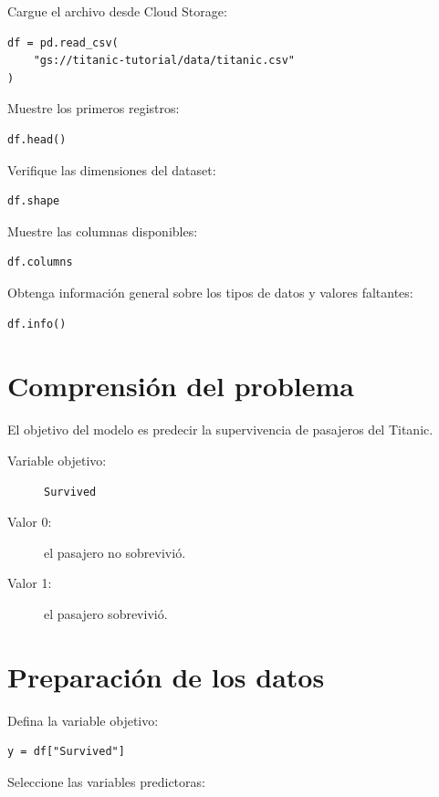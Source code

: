\documentclass[
  coursetitle={Cómputo Nube y Tecnologías Emergentes},
  coursehours={96},
  coursedate={Verano 2026},
  doctype={Tutorial},
  otherlangs={english,french},
  authorname={Lázaro},
  authorsurname={Bustio-Martínez},
  authortitle={PhD},
  role={Profesor Investigador},
  email={lbustio@inaoe.mx},
  phone={5559504000},
  ext={7459},
  institution={Instituto Nacional de Astrofísica, Óptica y Electrónica (INAOE)},
  department={Maestría en Ciencias en Tecnologías de Seguridad},
  address={Luis Enrique Erro 1, Sta. Ma. Tonantzintla, San Andrés Cholula, CP 72840, Puebla, México},
  margin={0.5in}
]{../../lbustio_lecture_notes}
\begin{document}
Cargue el archivo desde Cloud Storage:

\begin{lstlisting}
df = pd.read_csv(
    "gs://titanic-tutorial/data/titanic.csv"
)
\end{lstlisting}

Muestre los primeros registros:

\begin{lstlisting}
df.head()
\end{lstlisting}

Verifique las dimensiones del dataset:

\begin{lstlisting}
df.shape
\end{lstlisting}

Muestre las columnas disponibles:

\begin{lstlisting}
df.columns
\end{lstlisting}

Obtenga información general sobre los tipos de datos y valores faltantes:

\begin{lstlisting}
df.info()
\end{lstlisting}

\section{Comprensión del problema}

El objetivo del modelo es predecir la supervivencia de pasajeros del Titanic.

\begin{description}
    \item[Variable objetivo:] \texttt{Survived}
    \item[Valor 0:] el pasajero no sobrevivió.
    \item[Valor 1:] el pasajero sobrevivió.
\end{description}

\section{Preparación de los datos}

Defina la variable objetivo:

\begin{lstlisting}
y = df["Survived"]
\end{lstlisting}

Seleccione las variables predictoras:
\end{document}
